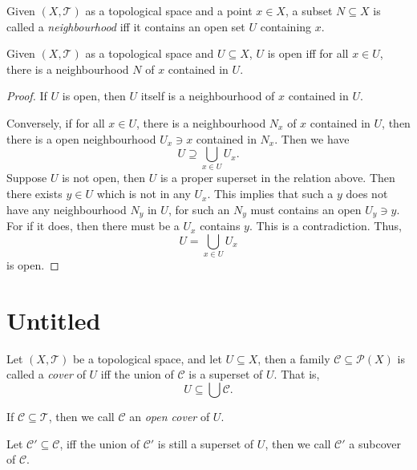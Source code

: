 \begin{definition}
	[neighbourhood]
	\label{def: neighbourhood}
	Given $(X, \mathcal T)$ as a topological space and a point $x \in X$, a subset $N \subseteq X$ is called a \textit{neighbourhood} iff it contains an open set $U$ containing $x$.
\end{definition}


\begin{proposition}
	Given $(X, \mathcal T)$ as a topological space and $U \subseteq X$, $U$ is open iff for all $x \in U$, there is a neighbourhood $N$ of $x$ contained in $U$.
	
	\begin{proof}
		If $U$ is open, then $U$ itself is a neighbourhood of $x$ contained in $U$.
		
		Conversely, if for all $x \in U$, there is a neighbourhood $N_x$ of $x$ contained in $U$, then there is a open neighbourhood $U_x \ni x$ contained in $N_x$. Then we have
		$$
		U \supseteq \bigcup_{x \in U} U_x.
		$$
		Suppose $U$ is not open, then $U$ is a proper superset in the relation above. Then there exists $y \in U$ which is not in any $U_x$. This implies that such a $y$ does not have any neighbourhood $N_y$ in $U$, for such an $N_y$ must contains an open $U_y \ni y$. For if it does, then there must be a $U_x$ contains $y$. This is a contradiction. Thus,
		$$
		U = \bigcup_{x \in U} U_x
		$$
		is open.
	\end{proof}
\end{proposition}





\section{Untitled}


\begin{definition}
	[cover]
	\label{def: cover}
	Let $(X, \mathcal T)$ be a topological space, and let $U \subseteq X$, then a family $\mathcal C \subseteq \mathcal P(X)$ is called a \textit{cover} of $U$ iff the union of $\mathcal C$ is a superset of $U$. That is,
	$$
	U \subseteq \bigcup \mathcal C.
	$$
	
	If $\mathcal C \subseteq \mathcal T$, then we call $\mathcal C$ an \textit{open cover} of $U$.
	
	Let $\mathcal C' \subseteq \mathcal C$, iff the union of $\mathcal C'$ is still a superset of $U$, then we call $\mathcal C'$ a subcover of $\mathcal C$.
\end{definition}


